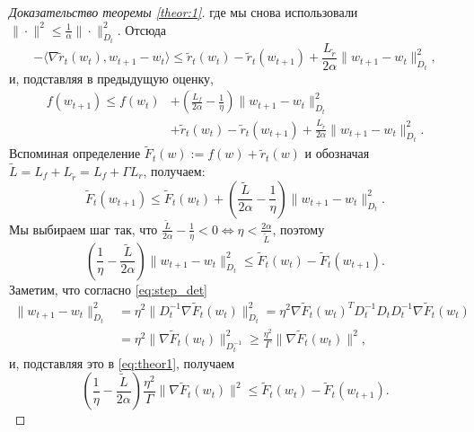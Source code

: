 \begin{proof}[Доказательство теоремы \ref{theor:1}]
где мы снова использовали $\|\cdot\|^2 \le \frac{1}{\alpha}\|\cdot\|^2_{D_t}$. Отсюда
\begin{equation*}
    -\langle \nabla \widetilde{r}_t(w_t), w_{t+1} - w_t \rangle \le \widetilde{r}_t(w_t) - \widetilde{r}_t(w_{t+1}) + \frac{L_{\tilde{r}}}{2\alpha} \|w_{t+1} - w_t\|_{D_t}^2,
\end{equation*}
и, подставляя в предыдущую оценку,
\begin{equation*}
\begin{split}
    f(w_{t+1}) \leq f(w_t) &+ \left( \frac{L_f}{2\alpha} - \frac{1}{\eta} \right) \|w_{t+1} - w_t\|_{D_t}^2 \\
    &+ \widetilde{r}_t(w_t) - \widetilde{r}_t(w_{t+1}) + \frac{L_{\tilde{r}}}{2\alpha}\|w_{t+1}-w_t\|_{D_t}^2.
\end{split}
\end{equation*}
Вспоминая определение $\widetilde{F}_t(w) := f(w) + \widetilde{r}_t(w)$ и обозначая $\widetilde{L} = L_f + L_{\tilde r} = L_f + \Gamma L_{r}$, получаем:
\begin{equation*}
    \widetilde{F}_t(w_{t+1}) \leq \widetilde{F}_t(w_t) + \left( \frac{\widetilde{L}}{2\alpha} - \frac{1}{\eta}  \right) \|w_{t+1} - w_t\|_{D_t}^2.
\end{equation*}
Мы выбираем шаг так, что $ \frac{\widetilde{L}}{2\alpha} - \frac{1}{\eta} < 0 \Leftrightarrow \eta < \frac{2 \alpha}{\widetilde{L}}$, поэтому
\begin{equation}
\label{eq:theor1}
    \left(\frac{1}{\eta} - \frac{\widetilde{L}}{2\alpha}   \right) \|w_{t+1} - w_t\|_{D_t}^2 \leq \widetilde{F}_t(w_t) - \widetilde{F}_t(w_{t+1}).
\end{equation}
Заметим, что согласно \eqref{eq:step_det}
\begin{equation*}
\begin{aligned}
    \|w_{t+1} - w_t\|^2_{D_t} &= \eta^2 \| D_t^{-1}
    \nabla \widetilde{F}_t(w_t) \|_{D_t}^2
    = \eta^2 \nabla \widetilde{F}_t(w_t)^T D_t^{-1} D_t  D_t^{-1}
    \nabla \widetilde{F}_t(w_t) \\
    &= \eta^2 \| \nabla \widetilde{F}_t(w_t) \|^2_{D_t^{-1}} \ge \frac{\eta^2}{\Gamma} \|\nabla\widetilde{F}_t(w_t)\|^2,
\end{aligned}
\end{equation*}
и, подставляя это в \eqref{eq:theor1}, получаем
\begin{equation}
\label{eq:theor1-1}
    \left(\frac{1}{\eta} - \frac{\widetilde{L}}{2\alpha}   \right) \frac{\eta^2}{\Gamma} \| \nabla\widetilde{F}_t(w_t) \|^2 \leq \widetilde{F}_t(w_t) - \widetilde{F}_t(w_{t+1}).

\end{equation}
\end{proof}
